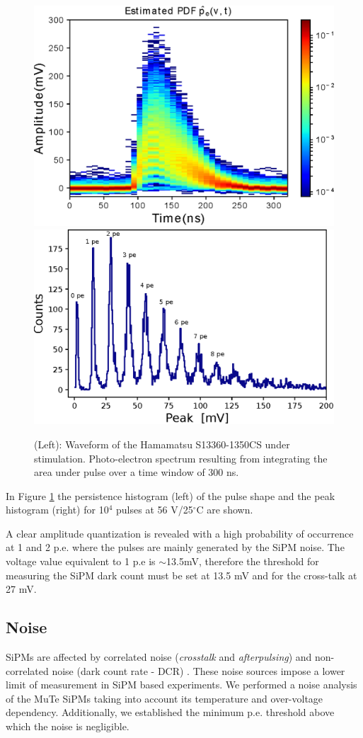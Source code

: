 \documentclass[a4paper,11pt]{article}
\begin{document}
\begin{figure}[htbp]
\centering %
\includegraphics[width=.48\textwidth]{Figures/PDF_1350CS.eps}
\includegraphics[width=.49\textwidth]{Figures/Peak_1350CS.eps}
\caption{\label{fig:peak} (Left): Waveform of the Hamamatsu S13360-1350CS under stimulation. Photo-electron spectrum resulting from integrating the area under pulse over a time window of 300 ns.}
\end{figure}

In Figure \ref{fig:peak} the persistence histogram (left) of the pulse shape and the peak histogram (right) for 10$^4$ pulses at 56 V/25$^{\circ}$C are shown.

A clear amplitude quantization is revealed with a high probability of occurrence at 1 and 2 p.e. where the pulses are mainly generated by the SiPM noise. The voltage value equivalent to 1 p.e is $\sim$13.5mV, therefore the threshold for measuring the SiPM dark count must be set at 13.5 mV and for the cross-talk at 27 mV.

\subsection{Noise}

SiPMs are affected by correlated noise (\textit{crosstalk} and \textit{afterpulsing}) and non-correlated noise (dark count rate - DCR) \cite{Baudis2018}. These noise sources impose a lower limit of measurement in SiPM based experiments. We performed a noise analysis of the MuTe SiPMs taking into account its temperature and over-voltage dependency. Additionally, we established the minimum p.e. threshold above which the noise is negligible.
\end{document}
